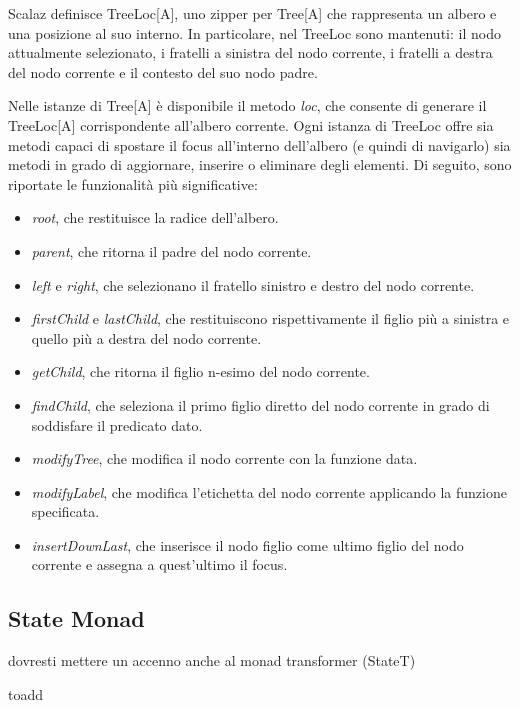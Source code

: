 Scalaz definisce TreeLoc[A], uno zipper per Tree[A] che rappresenta un albero e una posizione al suo interno. In particolare, nel TreeLoc sono mantenuti: il nodo attualmente selezionato, i fratelli a sinistra del nodo corrente, i fratelli a destra del nodo corrente e il contesto del suo nodo padre.

Nelle istanze di Tree[A] è disponibile il metodo \textit{loc}, che consente di generare il TreeLoc[A] corrispondente all'albero corrente. Ogni istanza di TreeLoc offre sia metodi capaci di spostare il focus all'interno dell'albero (e quindi di navigarlo) sia metodi in grado di aggiornare, inserire o eliminare degli elementi. Di seguito, sono riportate le funzionalità più significative:

\begin{itemize}
\item \textit{root}, che restituisce la radice dell'albero.
\item \textit{parent}, che ritorna il padre del nodo corrente.
\item \textit{left} e \textit{right}, che selezionano il fratello sinistro e destro del nodo corrente.
\item \textit{firstChild} e \textit{lastChild}, che restituiscono rispettivamente il figlio più a sinistra e quello più a destra del nodo corrente.
\item \textit{getChild}, che ritorna il figlio n-esimo del nodo corrente.
\item \textit{findChild}, che seleziona il primo figlio diretto del nodo corrente in grado di soddisfare il predicato dato.
\item \textit{modifyTree}, che modifica il nodo corrente con la funzione data.
\item \textit{modifyLabel}, che modifica l'etichetta del nodo corrente applicando la funzione specificata.
\item \textit{insertDownLast}, che inserisce il nodo figlio come ultimo figlio del nodo corrente e assegna a quest'ultimo il focus.
\end{itemize}



\subsection{State Monad}

dovresti mettere un accenno anche al monad transformer (StateT)

toadd\cite{ScalazStateMonad}

